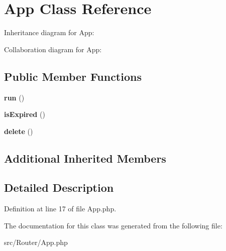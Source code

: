\hypertarget{class_zest_1_1_router_1_1_app}{}\section{App Class Reference}
\label{class_zest_1_1_router_1_1_app}


Inheritance diagram for App\+:


Collaboration diagram for App\+:
\subsection*{Public Member Functions}
\begin{DoxyCompactItemize}
\item 
\mbox{\label{class_zest_1_1_router_1_1_app_afb0fafe7e02a3ae1993c01c19fad2bae}} 
{\bfseries run} ()
\item 
\mbox{\label{class_zest_1_1_router_1_1_app_abb11289cf089b701b7dc4002c10713d1}} 
{\bfseries is\+Expired} ()
\item 
\mbox{\label{class_zest_1_1_router_1_1_app_a13bdffdd926f26b825ea57066334ff01}} 
{\bfseries delete} ()
\end{DoxyCompactItemize}
\subsection*{Additional Inherited Members}


\subsection{Detailed Description}


Definition at line 17 of file App.\+php.



The documentation for this class was generated from the following file\+:\begin{DoxyCompactItemize}
\item 
src/\+Router/App.\+php\end{DoxyCompactItemize}
